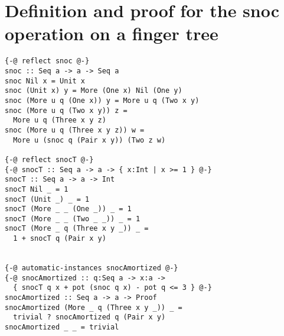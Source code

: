 \documentclass[sigplan,screen]{acmart}
\begin{document}
\balance

\section{Definition and proof for the snoc operation on a finger tree}

\begin{lstlisting}
{-@ reflect snoc @-}
snoc :: Seq a -> a -> Seq a
snoc Nil x = Unit x
snoc (Unit x) y = More (One x) Nil (One y)
snoc (More u q (One x)) y = More u q (Two x y)
snoc (More u q (Two x y)) z =
  More u q (Three x y z)
snoc (More u q (Three x y z)) w =
  More u (snoc q (Pair x y)) (Two z w)

{-@ reflect snocT @-}
{-@ snocT :: Seq a -> a -> { x:Int | x >= 1 } @-}
snocT :: Seq a -> a -> Int
snocT Nil _ = 1
snocT (Unit _) _ = 1
snocT (More _ _ (One _)) _ = 1
snocT (More _ _ (Two _ _)) _ = 1
snocT (More _ q (Three x y _)) _ =
  1 + snocT q (Pair x y)


{-@ automatic-instances snocAmortized @-}
{-@ snocAmortized :: q:Seq a -> x:a ->
  { snocT q x + pot (snoc q x) - pot q <= 3 } @-}
snocAmortized :: Seq a -> a -> Proof
snocAmortized (More _ q (Three x y _)) _ =
  trivial ? snocAmortized q (Pair x y)
snocAmortized _ _ = trivial

\end{lstlisting}
\end{document}
